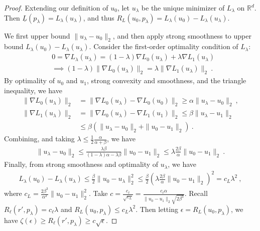 \documentclass[12pt]{article}
\newcommand{\reals}{\mathbb{R}}
\newcommand{\risk}[1]{\underline{#1}}
\begin{document}
\begin{proof}
  Extending our definition of $u_0$, let $u_\lambda$ be the unique minimizer of $L_\lambda$ on $\reals^d$.
  Then $\risk{L}(p_\lambda) = L_\lambda(u_\lambda)$, and thus $R_L(u_0,p_\lambda) = L_\lambda(u_0) - L_\lambda(u_\lambda)$.

  We first upper bound $\|u_\lambda - u_0\|_2$, and then apply strong smoothness to upper bound $L_\lambda(u_0) - L_\lambda(u_\lambda)$.
  Consider the first-order optimality condition of $L_\lambda$:
  \begin{align*}
    \label{eq:first-order-opt-smooth}
    & 0 = \nabla L_\lambda(u_\lambda) = (1-\lambda) \nabla L_0(u_\lambda) + \lambda \nabla L_1(u_\lambda)
    \\
    & \implies (1-\lambda) \|\nabla L_0(u_\lambda)\|_2 = \lambda \|\nabla L_1(u_\lambda)\|_2~.
  \end{align*}
  By optimality of $u_0$ and $u_1$, strong convexity and smoothness, and the triangle inequality, we have
  \begin{align*}
    \|\nabla L_0(u_\lambda)\|_2 &= \|\nabla L_0(u_\lambda) - \nabla L_0(u_0)\|_2 \geq \alpha \|u_\lambda - u_0\|_2~,
    \\
    \|\nabla L_1(u_\lambda)\|_2 &= \|\nabla L_0(u_\lambda) - \nabla L_1(u_1)\|_2 \leq \beta \|u_\lambda - u_1\|_2
    \\
    &\leq \beta \left( \|u_\lambda - u_0\|_2 + \|u_0 - u_1\|_2 \right)~.
  \end{align*}
  Combining, and taking $\lambda \leq \tfrac 1 2 \tfrac {\alpha}{\alpha+\beta}$, we have
  \begin{align*}
    \|u_\lambda - u_0\|_2 \leq \frac{\lambda\beta}{(1-\lambda)\alpha-\lambda\beta} \|u_0 - u_1\|_2  \leq \lambda \frac{2\beta}{\alpha} \|u_0 - u_1\|_2 ~.
  \end{align*}
  Finally, from strong smoothness and optimality of $u_\lambda$, we have
  \begin{align*}
    L_\lambda(u_0) - L_\lambda(u_\lambda) \leq \frac{\beta}{2} \|u_0 - u_\lambda\|_2^2 \leq \frac{\beta}{2} \left(\lambda \frac{2\beta}{\alpha} \|u_0 - u_1\|_2\right)^2 = c_L \lambda^2~,
  \end{align*}
  where $c_L = \frac{2\beta^3}{\alpha^2} \|u_0 - u_1\|_2^2$.
  Take $c = \frac{c_\ell}{\sqrt{c_L}} = \frac{c_\ell \alpha}{\|u_0 - u_1\|_2 \sqrt{2\beta^3}}$.
  Recall $R_\ell(r',p_\lambda) = c_\ell \lambda$ and $R_L(u_0,p_\lambda) \leq c_L \lambda^2$.
  Then letting $\epsilon = R_L(u_0,p_\lambda)$, we have $\zeta(\epsilon) \geq R_\ell(r',p_\lambda) \geq c \sqrt{\epsilon}$.
\end{proof}
\end{document}
